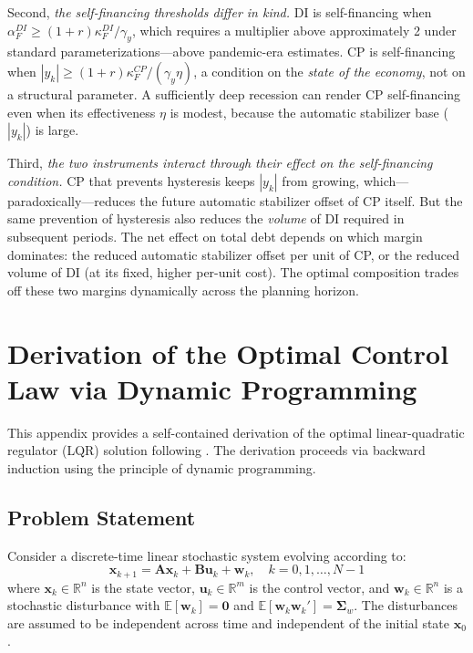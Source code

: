 \documentclass[12pt, a4paper]{article}
\begin{document}
Second, \textit{the self-financing thresholds differ in kind.} DI is
self-financing when $\alpha_F^{DI} \geq (1+r) \kappa_F^{DI} / \gamma_y$,
which requires a multiplier above approximately 2 under standard
parameterizations---above pandemic-era estimates. CP is self-financing when
$|y_k| \geq (1+r) \kappa_F^{CP} / (\gamma_y \eta)$, a condition on the
\textit{state of the economy}, not on a structural parameter. A sufficiently
deep recession can render CP self-financing even when its effectiveness $\eta$
is modest, because the automatic stabilizer base ($|y_k|$) is large.

Third, \textit{the two instruments interact through their effect on the
self-financing condition.} CP that prevents hysteresis keeps $|y_k|$ from
growing, which---paradoxically---reduces the future automatic stabilizer offset
of CP itself. But the same prevention of hysteresis also reduces the
\textit{volume} of DI required in subsequent periods. The net effect on total
debt depends on which margin dominates: the reduced automatic stabilizer offset
per unit of CP, or the reduced volume of DI (at its fixed, higher per-unit
cost). The optimal composition trades off these two margins dynamically across
the planning horizon.


\section{Derivation of the Optimal Control Law via Dynamic Programming}
\label{app:LQR_derivation}

This appendix provides a self-contained derivation of the optimal 
linear-quadratic regulator (LQR) solution following 
\citet[Chapter~3.1]{bertsekas2017dynamic}. The derivation proceeds 
via backward induction using the principle of dynamic programming.

\subsection{Problem Statement}

Consider a discrete-time linear stochastic system evolving according to:
\begin{equation}
    \bm{x}_{k+1} = \bm{A}\bm{x}_k + \bm{B}\bm{u}_k + \bm{w}_k, 
    \quad k = 0, 1, \ldots, N-1
    \label{eq:app_system}
\end{equation}
where $\bm{x}_k \in \mathbb{R}^n$ is the state vector, 
$\bm{u}_k \in \mathbb{R}^m$ is the control vector, and 
$\bm{w}_k \in \mathbb{R}^n$ is a stochastic disturbance with 
$\mathbb{E}[\bm{w}_k] = \bm{0}$ and 
$\mathbb{E}[\bm{w}_k \bm{w}_k'] = \bm{\Sigma}_w$. The disturbances 
are assumed to be independent across time and independent of the 
initial state $\bm{x}_0$.
\end{document}
